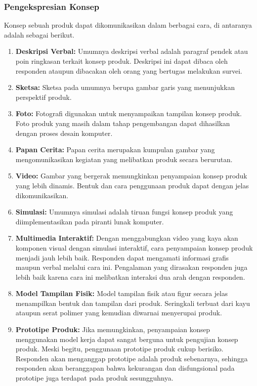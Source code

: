 \subsubsection{Pengekspresian Konsep}
Konsep sebuah produk dapat dikomunikasikan dalam berbagai cara, di antaranya adalah sebagai berikut.
\begin{enumerate}
    \item \textbf{Deskripsi Verbal:} Umumnya deskripsi verbal adalah paragraf pendek atau poin ringkasan terkait konsep produk. Deskripsi ini dapat dibaca oleh responden ataupun dibacakan oleh orang yang bertugas melakukan survei.
    \item \textbf{Sketsa:} Sketsa pada umumnya berupa gambar garis yang menunjukkan perspektif produk.
    \item \textbf{Foto:} Fotografi digunakan untuk menyampaikan tampilan konsep produk. Foto produk yang masih dalam tahap pengembangan dapat dihasilkan dengan proses desain komputer.
    \item \textbf{Papan Cerita:} Papan cerita merupakan kumpulan gambar yang mengomunikasikan kegiatan yang melibatkan produk secara berurutan.
    \item \textbf{Video:} Gambar yang bergerak memungkinkan penyampaian konsep produk yang lebih dinamis. Bentuk dan cara penggunaan produk dapat dengan jelas dikomunikasikan.
    \item \textbf{Simulasi:} Umumnya simulasi adalah tiruan fungsi konsep produk yang diimplementasikan pada piranti lunak komputer.
    \item \textbf{Multimedia Interaktif:} Dengan menggabungkan video yang kaya akan komponen visual dengan simulasi interaktif, cara penyampaian konsep produk menjadi jauh lebih baik. Responden dapat mengamati informasi grafis maupun verbal melalui cara ini. Pengalaman yang dirasakan responden juga lebih baik karena cara ini melibatkan interaksi dua arah dengan responden.
    \item \textbf{Model Tampilan Fisik:} Model tampilan fisik atau figur secara jelas menampilkan bentuk dan tampilan dari produk. Seringkali terbuat dari kayu ataupun serat polimer yang kemudian diwarnai menyerupai produk.
    \item \textbf{Prototipe Produk:} Jika memungkinkan, penyampaian konsep menggunakan model kerja dapat sangat berguna untuk pengujian konsep produk. Meski begitu, penggunaan prototipe produk cukup berisiko. Responden akan menganggap prototipe adalah produk sebenarnya, sehingga responden akan beranggapan bahwa kekurangan dan disfungsional pada prototipe juga terdapat pada produk sesungguhnya.
\end{enumerate}

